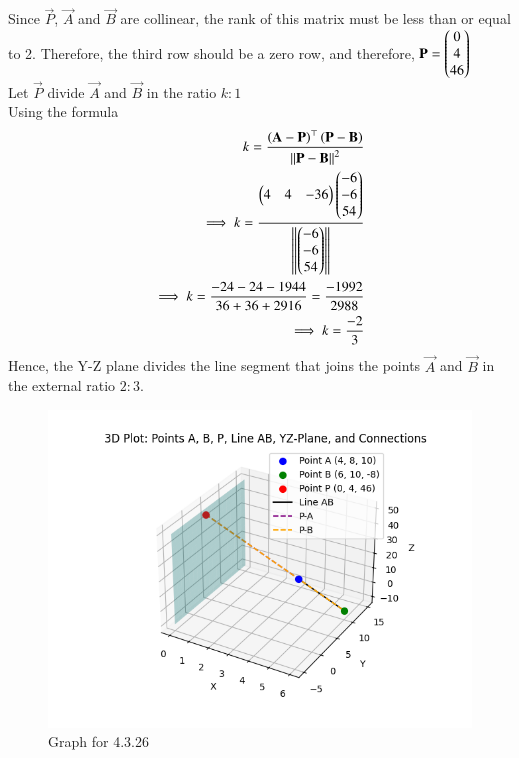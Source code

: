 \documentclass[journal,12pt,onecolumn]{IEEEtran}
\theoremstyle{remark}
\begin{document}
Since $\vec{P}$, $\vec{A}$ and $\vec{B}$ are collinear, the rank of this matrix must be less than or equal to 2. Therefore, the third row should be a zero row, and therefore, $\mathbf{P}=\begin{pmatrix}0 \\ 4 \\ 46\end{pmatrix}$\\
Let $\vec{P}$ divide $\vec{A}$ and $\vec{B}$ in the ratio $k:1$\\
Using the formula 
\begin{align}
    k=\dfrac{\left(\mathbf{A}-\mathbf{P}\right)^{\top} \left(\mathbf{P}-\mathbf{B}\right)}{\left\lVert\mathbf{P}-\mathbf{B}\right\rVert^2}\\
    \implies k=\dfrac{\begin{pmatrix}4 & 4 & -36\end{pmatrix} \begin{pmatrix}-6 \\ -6 \\ 54\end{pmatrix}}{\left\lVert\begin{pmatrix}-6 \\ -6 \\ 54\end{pmatrix}\right\rVert}\\
    \implies k= \dfrac{-24 -24 -1944}{36 + 36 + 2916} = \dfrac{-1992}{2988}\\
    \implies k= \frac{-2}{3}
\end{align}
Hence, the Y-Z plane divides the line segment that joins the points $\vec{A}$ and $\vec{B}$ in the external ratio $2:3$.
\begin{figure}[H]
        \centering
        \includegraphics[width=1\columnwidth]{figs/1.png}
        \caption{Graph for 4.3.26}
        \label{fig:placeholder}
    \end{figure}
\end{document}
